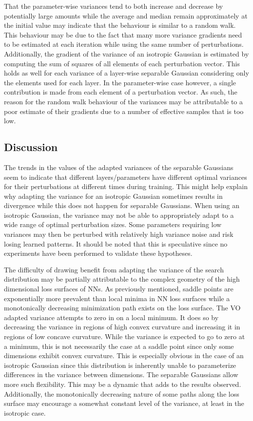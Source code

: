 That the parameter-wise variances tend to both increase and decrease by potentially large amounts while the average and median remain approximately at the initial value may indicate that the behaviour is similar to a random walk. 
This behaviour may be due to the fact that many more variance gradients need to be estimated at each iteration while using the same number of perturbations. Additionally, the gradient of the variance of an isotropic Gaussian is estimated by computing the sum of squares of all elements of each perturbation vector. This holds as well for each variance of a layer-wise separable Gaussian considering only the elements used for each layer. In the parameter-wise case however, a single contribution is made from each element of a perturbation vector.
As such, the reason for the random walk behaviour of the variances may be attributable to a poor estimate of their gradients due to a number of effective samples that is too low.


\subsection{Discussion}
The trends in the values of the adapted variances of the separable Gaussians seem to indicate that different layers/parameters have different optimal variances for their perturbations at different times during training. This might help explain why adapting the variance for an isotropic Gaussian sometimes results in divergence while this does not happen for separable Gaussians. When using an isotropic Gaussian, the variance may not be able to appropriately adapt to a wide range of optimal perturbation sizes. Some parameters requiring low variances may then be perturbed with relatively high variance noise and risk losing learned patterns. It should be noted that this is speculative since no experiments have been performed to validate these hypotheses.

The difficulty of drawing benefit from adapting the variance of the search distribution may be partially attributable to the complex geometry of the high dimensional loss surfaces of \glspl{NN}. As previously mentioned, saddle points are exponentially more prevalent than local minima in \gls{NN} loss surfaces while a monotonically decreasing minimization path exists on the loss surface.
The \gls{VO} adapted variance attempts to zero in on a local minimum. It does so by decreasing the variance in regions of high convex curvature and increasing it in regions of low concave curvature.
While the variance is expected to go to zero at a minimum, this is not necessarily the case at a saddle point since only some dimensions exhibit convex curvature.
This is especially obvious in the case of an isotropic Gaussian since this distribution is inherently unable to parameterize differences in the variance between dimensions.
The separable Gaussians allow more such flexibility. This may be a dynamic that adds to the results observed.
Additionally, the monotonically decreasing nature of some paths along the loss surface may encourage a somewhat constant level of the variance, at least in the isotropic case.


